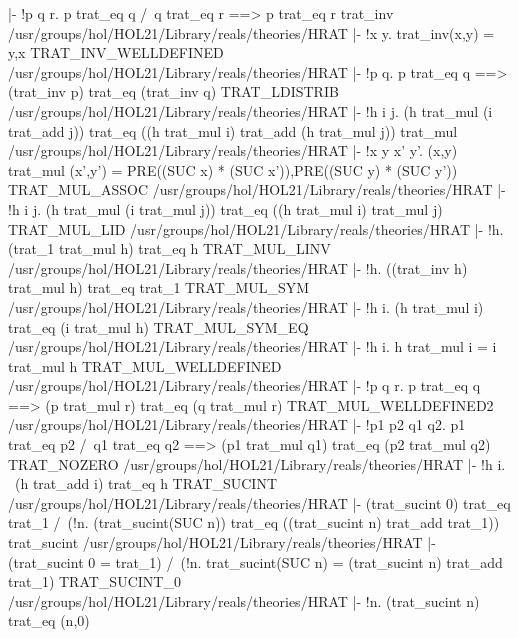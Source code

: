 |- !p q r. p trat_eq q /\ q trat_eq r ==> p trat_eq r
\ENDTHEOREM
\THEOREM trat\_inv /usr/groups/hol/HOL21/Library/reals/theories/HRAT
|- !x y. trat_inv(x,y) = y,x
\ENDTHEOREM
\THEOREM TRAT\_INV\_WELLDEFINED /usr/groups/hol/HOL21/Library/reals/theories/HRAT
|- !p q. p trat_eq q ==> (trat_inv p) trat_eq (trat_inv q)
\ENDTHEOREM
\THEOREM TRAT\_LDISTRIB /usr/groups/hol/HOL21/Library/reals/theories/HRAT
|- !h i j.
    (h trat_mul (i trat_add j)) trat_eq
    ((h trat_mul i) trat_add (h trat_mul j))
\ENDTHEOREM
\THEOREM trat\_mul /usr/groups/hol/HOL21/Library/reals/theories/HRAT
|- !x y x' y'.
    (x,y) trat_mul (x',y') =
    PRE((SUC x) * (SUC x')),PRE((SUC y) * (SUC y'))
\ENDTHEOREM
\THEOREM TRAT\_MUL\_ASSOC /usr/groups/hol/HOL21/Library/reals/theories/HRAT
|- !h i j.
    (h trat_mul (i trat_mul j)) trat_eq ((h trat_mul i) trat_mul j)
\ENDTHEOREM
\THEOREM TRAT\_MUL\_LID /usr/groups/hol/HOL21/Library/reals/theories/HRAT
|- !h. (trat_1 trat_mul h) trat_eq h
\ENDTHEOREM
\THEOREM TRAT\_MUL\_LINV /usr/groups/hol/HOL21/Library/reals/theories/HRAT
|- !h. ((trat_inv h) trat_mul h) trat_eq trat_1
\ENDTHEOREM
\THEOREM TRAT\_MUL\_SYM /usr/groups/hol/HOL21/Library/reals/theories/HRAT
|- !h i. (h trat_mul i) trat_eq (i trat_mul h)
\ENDTHEOREM
\THEOREM TRAT\_MUL\_SYM\_EQ /usr/groups/hol/HOL21/Library/reals/theories/HRAT
|- !h i. h trat_mul i = i trat_mul h
\ENDTHEOREM
\THEOREM TRAT\_MUL\_WELLDEFINED /usr/groups/hol/HOL21/Library/reals/theories/HRAT
|- !p q r. p trat_eq q ==> (p trat_mul r) trat_eq (q trat_mul r)
\ENDTHEOREM
\THEOREM TRAT\_MUL\_WELLDEFINED2 /usr/groups/hol/HOL21/Library/reals/theories/HRAT
|- !p1 p2 q1 q2.
    p1 trat_eq p2 /\ q1 trat_eq q2 ==>
    (p1 trat_mul q1) trat_eq (p2 trat_mul q2)
\ENDTHEOREM
\THEOREM TRAT\_NOZERO /usr/groups/hol/HOL21/Library/reals/theories/HRAT
|- !h i. ~(h trat_add i) trat_eq h
\ENDTHEOREM
\THEOREM TRAT\_SUCINT /usr/groups/hol/HOL21/Library/reals/theories/HRAT
|- (trat_sucint 0) trat_eq trat_1 /\
   (!n. (trat_sucint(SUC n)) trat_eq ((trat_sucint n) trat_add trat_1))
\ENDTHEOREM
\THEOREM trat\_sucint /usr/groups/hol/HOL21/Library/reals/theories/HRAT
|- (trat_sucint 0 = trat_1) /\
   (!n. trat_sucint(SUC n) = (trat_sucint n) trat_add trat_1)
\ENDTHEOREM
\THEOREM TRAT\_SUCINT\_0 /usr/groups/hol/HOL21/Library/reals/theories/HRAT
|- !n. (trat_sucint n) trat_eq (n,0)
\ENDTHEOREM
